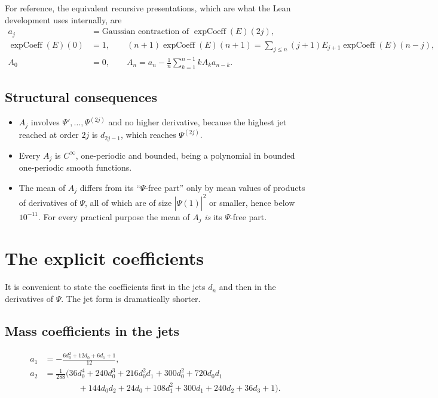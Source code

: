 \documentclass[11pt,oneside]{article}
\theoremstyle{definition}
\theoremstyle{remark}
\newcommand{\Psihat}{\widehat\Psi}
\begin{document}
For reference, the equivalent recursive presentations, which are what the Lean
development uses internally, are
\[
\begin{aligned}
  a_j&=\text{Gaussian contraction of }\operatorname{expCoeff}(E)(2j),\\
  \operatorname{expCoeff}(E)(0)&=1,\qquad
  (n+1)\operatorname{expCoeff}(E)(n+1)
    =\sum_{j\le n}(j+1)E_{j+1}\operatorname{expCoeff}(E)(n-j),\\
  A_0&=0,\qquad A_n=a_n-\frac1n\sum_{k=1}^{n-1}kA_ka_{n-k}.
\end{aligned}
\]

\subsection{Structural consequences}

\begin{itemize}
\item $A_j$ involves $\Psi',\dots,\Psi^{(2j)}$ and no higher derivative,
  because the highest jet reached at order $2j$ is $d_{2j-1}$, which reaches
  $\Psi^{(2j)}$.
\item Every $A_j$ is $C^\infty$, one-periodic and bounded, being a polynomial
  in bounded one-periodic smooth functions.
\item The mean of $A_j$ differs from its ``$\Psi$-free part'' only by mean
  values of products of derivatives of $\Psi$, all of which are of size
  $|\Psihat(1)|^2$ or smaller, hence below $10^{-11}$.  For every practical
  purpose the mean of $A_j$ \emph{is} its $\Psi$-free part.
\end{itemize}

\section{The explicit coefficients}\label{sec:explicit}

It is convenient to state the coefficients first in the jets $d_n$ and then in
the derivatives of $\Psi$.  The jet form is dramatically shorter.

\subsection{Mass coefficients in the jets}

\[
\begin{aligned}
  a_1&=-\frac{6d_0^2+12d_0+6d_1+1}{12},\\[0.3em]
  a_2&=\frac{1}{288}\bigl(36d_0^4+240d_0^3+216d_0^2d_1+300d_0^2+720d_0d_1\\
     &\qquad\qquad+144d_0d_2+24d_0+108d_1^2+300d_1+240d_2+36d_3+1\bigr).
\end{aligned}
\]
\end{document}
